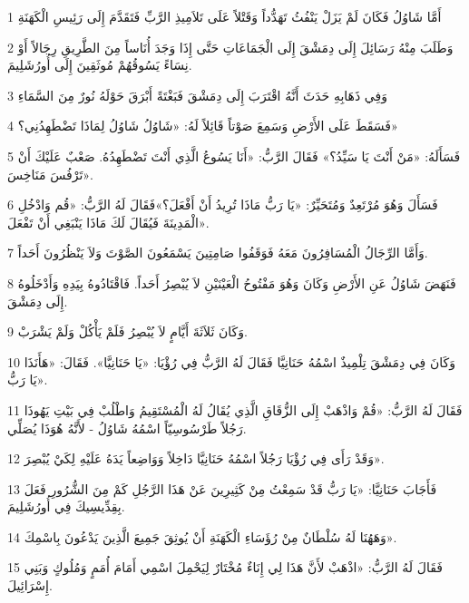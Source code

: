\par 1 أَمَّا شَاوُلُ فَكَانَ لَمْ يَزَلْ يَنْفُثُ تَهَدُّداً وَقَتْلاً عَلَى تَلاَمِيذِ الرَّبِّ فَتَقَدَّمَ إِلَى رَئِيسِ الْكَهَنَةِ
\par 2 وَطَلَبَ مِنْهُ رَسَائِلَ إِلَى دِمَشْقَ إِلَى الْجَمَاعَاتِ حَتَّى إِذَا وَجَدَ أُنَاساً مِنَ الطَّرِيقِ رِجَالاً أَوْ نِسَاءً يَسُوقُهُمْ مُوثَقِينَ إِلَى أُورُشَلِيمَ.
\par 3 وَفِي ذَهَابِهِ حَدَثَ أَنَّهُ اقْتَرَبَ إِلَى دِمَشْقَ فَبَغْتَةً أَبْرَقَ حَوْلَهُ نُورٌ مِنَ السَّمَاءِ
\par 4 فَسَقَطَ عَلَى الأَرْضِ وَسَمِعَ صَوْتاً قَائِلاً لَهُ: «شَاوُلُ شَاوُلُ لِمَاذَا تَضْطَهِدُنِي؟»
\par 5 فَسَأَلَهُ: «مَنْ أَنْتَ يَا سَيِّدُ؟» فَقَالَ الرَّبُّ: «أَنَا يَسُوعُ الَّذِي أَنْتَ تَضْطَهِدُهُ. صَعْبٌ عَلَيْكَ أَنْ تَرْفُسَ مَنَاخِسَ».
\par 6 فَسَأَلَ وَهُوَ مُرْتَعِدٌ وَمُتَحَيِّرٌ: «يَا رَبُّ مَاذَا تُرِيدُ أَنْ أَفْعَلَ؟»فَقَالَ لَهُ الرَّبُّ: «قُم وَادْخُلِ الْمَدِينَةَ فَيُقَالَ لَكَ مَاذَا يَنْبَغِي أَنْ تَفْعَلَ».
\par 7 وَأَمَّا الرِّجَالُ الْمُسَافِرُونَ مَعَهُ فَوَقَفُوا صَامِتِينَ يَسْمَعُونَ الصَّوْتَ وَلاَ يَنْظُرُونَ أَحَداً.
\par 8 فَنَهَضَ شَاوُلُ عَنِ الأَرْضِ وَكَانَ وَهُوَ مَفْتُوحُ الْعَيْنَيْنِ لاَ يُبْصِرُ أَحَداً. فَاقْتَادُوهُ بِيَدِهِ وَأَدْخَلُوهُ إِلَى دِمَشْقَ.
\par 9 وَكَانَ ثَلاَثَةَ أَيَّامٍ لاَ يُبْصِرُ فَلَمْ يَأْكُلْ وَلَمْ يَشْرَبْ.
\par 10 وَكَانَ فِي دِمَشْقَ تِلْمِيذٌ اسْمُهُ حَنَانِيَّا فَقَالَ لَهُ الرَّبُّ فِي رُؤْيَا: «يَا حَنَانِيَّا». فَقَالَ: «هَأَنَذَا يَا رَبُّ».
\par 11 فَقَالَ لَهُ الرَّبُّ: «قُمْ وَاذْهَبْ إِلَى الزُّقَاقِ الَّذِي يُقَالُ لَهُ الْمُسْتَقِيمُ وَاطْلُبْ فِي بَيْتِ يَهُوذَا رَجُلاً طَرْسُوسِيّاً اسْمُهُ شَاوُلُ - لأَنَّهُ هُوَذَا يُصَلِّي.
\par 12 وَقَدْ رَأَى فِي رُؤْيَا رَجُلاً اسْمُهُ حَنَانِيَّا دَاخِلاً وَوَاضِعاً يَدَهُ عَلَيْهِ لِكَيْ يُبْصِرَ».
\par 13 فَأَجَابَ حَنَانِيَّا: «يَا رَبُّ قَدْ سَمِعْتُ مِنْ كَثِيرِينَ عَنْ هَذَا الرَّجُلِ كَمْ مِنَ الشُّرُورِ فَعَلَ بِقِدِّيسِيكَ فِي أُورُشَلِيمَ.
\par 14 وَهَهُنَا لَهُ سُلْطَانٌ مِنْ رُؤَسَاءِ الْكَهَنَةِ أَنْ يُوثِقَ جَمِيعَ الَّذِينَ يَدْعُونَ بِاسْمِكَ».
\par 15 فَقَالَ لَهُ الرَّبُّ: «اذْهَبْ لأَنَّ هَذَا لِي إِنَاءٌ مُخْتَارٌ لِيَحْمِلَ اسْمِي أَمَامَ أُمَمٍ وَمُلُوكٍ وَبَنِي إِسْرَائِيلَ.
